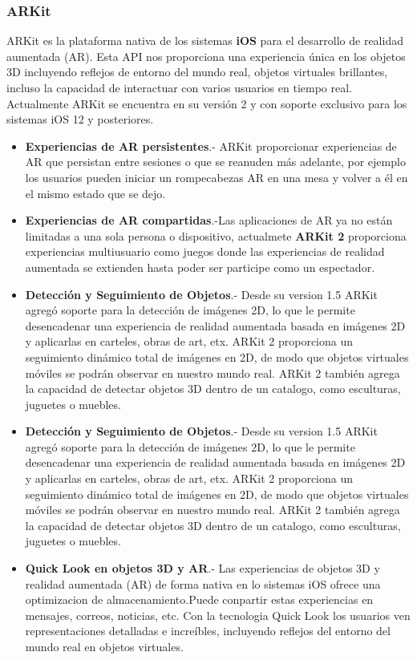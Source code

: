 \subsubsection{ARKit}
ARKit es la plataforma nativa de los sistemas \textbf{iOS} para el desarrollo de realidad aumentada (AR). Esta API nos proporciona una experiencia única en los objetos 3D incluyendo reflejos de entorno del mundo real, objetos virtuales brillantes, incluso la capacidad de interactuar con varios usuarios en tiempo real. Actualmente ARKit se encuentra en su versión 2 y con soporte exclusivo para los sistemas iOS 12 y posteriores.\cite{B20}
\begin{itemize}
	\item \textbf{Experiencias de AR persistentes}.-
	ARKit proporcionar experiencias de AR que persistan entre sesiones o que se reanuden más adelante, por ejemplo los usuarios pueden iniciar un rompecabezas AR en una mesa y volver a él en el mismo estado que se dejo.\cite{B20}
	\item \textbf{Experiencias de AR compartidas}.-Las aplicaciones de AR ya no están limitadas a una sola persona o dispositivo, actualmete \textbf{ARKit 2} proporciona experiencias multiusuario como juegos donde las experiencias de realidad aumentada se extienden hasta poder ser participe como un espectador.\cite{B20}
	\item \textbf{Detección y Seguimiento de Objetos}.- Desde su version 1.5  ARKit agregó soporte para la detección de imágenes 2D, lo que le permite desencadenar una experiencia de realidad aumentada basada en imágenes 2D y aplicarlas en  carteles, obras de art, etx. ARKit 2 proporciona un seguimiento dinámico total de imágenes en 2D, de modo que objetos virtuales móviles se podrán observar en nuestro mundo real. ARKit 2 también agrega la capacidad de detectar objetos 3D dentro de un catalogo, como esculturas, juguetes o muebles.\cite{B20}
	\item \textbf{Detección y Seguimiento de Objetos}.- Desde su version 1.5  ARKit agregó soporte para la detección de imágenes 2D, lo que le permite desencadenar una experiencia de realidad aumentada basada en imágenes 2D y aplicarlas en  carteles, obras de art, etx. ARKit 2 proporciona un seguimiento dinámico total de imágenes en 2D, de modo que objetos virtuales móviles se podrán observar en nuestro mundo real. ARKit 2 también agrega la capacidad de detectar objetos 3D dentro de un catalogo, como esculturas, juguetes o muebles.\cite{B20}
	\item \textbf{Quick Look en objetos 3D y AR}.- Las experiencias de objetos 3D y realidad aumentada (AR)  de forma nativa en lo sistemas iOS ofrece una optimizacion de almacenamiento.Puede conpartir estas experiencias en mensajes, correos, noticias, etc. Con la tecnologia Quick Look los usuarios ven representaciones detalladas e increíbles, incluyendo reflejos del entorno del mundo real en objetos virtuales.\cite{B20}
\end{itemize}
